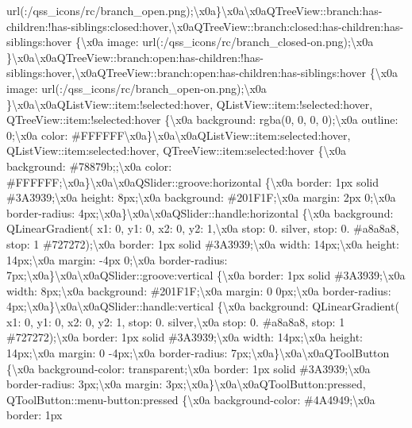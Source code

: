 url(\+:/qss\+\_\+icons/rc/branch\+\_\+open.\+png);\textbackslash{}x0a\}\textbackslash{}x0a\textbackslash{}x0a\+Q\+Tree\+View\+::branch\+:has-\/children\+:!has-\/siblings\+:closed\+:hover,\textbackslash{}x0a\+Q\+Tree\+View\+::branch\+:closed\+:has-\/children\+:has-\/siblings\+:hover \{\textbackslash{}x0a image\+: url(\+:/qss\+\_\+icons/rc/branch\+\_\+closed-\/on.\+png);\textbackslash{}x0a \}\textbackslash{}x0a\textbackslash{}x0a\+Q\+Tree\+View\+::branch\+:open\+:has-\/children\+:!has-\/siblings\+:hover,\textbackslash{}x0a\+Q\+Tree\+View\+::branch\+:open\+:has-\/children\+:has-\/siblings\+:hover \{\textbackslash{}x0a image\+: url(\+:/qss\+\_\+icons/rc/branch\+\_\+open-\/on.\+png);\textbackslash{}x0a \}\textbackslash{}x0a\textbackslash{}x0a\+Q\+List\+View\+::item\+:!selected\+:hover, Q\+List\+View\+::item\+:!selected\+:hover, Q\+Tree\+View\+::item\+:!selected\+:hover \{\textbackslash{}x0a background\+: rgba(0, 0, 0, 0);\textbackslash{}x0a outline\+: 0;\textbackslash{}x0a color\+: \#\+F\+F\+F\+F\+F\+F\textbackslash{}x0a\}\textbackslash{}x0a\textbackslash{}x0a\+Q\+List\+View\+::item\+:selected\+:hover, Q\+List\+View\+::item\+:selected\+:hover, Q\+Tree\+View\+::item\+:selected\+:hover \{\textbackslash{}x0a background\+: \#78879b;;\textbackslash{}x0a color\+: \#\+F\+F\+F\+F\+F\+F;\textbackslash{}x0a\}\textbackslash{}x0a\textbackslash{}x0a\+Q\+Slider\+::groove\+:horizontal \{\textbackslash{}x0a border\+: 1px solid \#3\+A3939;\textbackslash{}x0a height\+: 8px;\textbackslash{}x0a background\+: \#201\+F1\+F;\textbackslash{}x0a margin\+: 2px 0;\textbackslash{}x0a border-\/radius\+: 4px;\textbackslash{}x0a\}\textbackslash{}x0a\textbackslash{}x0a\+Q\+Slider\+::handle\+:horizontal \{\textbackslash{}x0a background\+: Q\+Linear\+Gradient( x1\+: 0, y1\+: 0, x2\+: 0, y2\+: 1,\textbackslash{}x0a stop\+: 0. silver, stop\+: 0. \#a8a8a8, stop\+: 1 \#727272);\textbackslash{}x0a border\+: 1px solid \#3\+A3939;\textbackslash{}x0a width\+: 14px;\textbackslash{}x0a height\+: 14px;\textbackslash{}x0a margin\+: -\/4px 0;\textbackslash{}x0a border-\/radius\+: 7px;\textbackslash{}x0a\}\textbackslash{}x0a\textbackslash{}x0a\+Q\+Slider\+::groove\+:vertical \{\textbackslash{}x0a border\+: 1px solid \#3\+A3939;\textbackslash{}x0a width\+: 8px;\textbackslash{}x0a background\+: \#201\+F1\+F;\textbackslash{}x0a margin\+: 0 0px;\textbackslash{}x0a border-\/radius\+: 4px;\textbackslash{}x0a\}\textbackslash{}x0a\textbackslash{}x0a\+Q\+Slider\+::handle\+:vertical \{\textbackslash{}x0a background\+: Q\+Linear\+Gradient( x1\+: 0, y1\+: 0, x2\+: 0, y2\+: 1, stop\+: 0. silver,\textbackslash{}x0a stop\+: 0. \#a8a8a8, stop\+: 1 \#727272);\textbackslash{}x0a border\+: 1px solid \#3\+A3939;\textbackslash{}x0a width\+: 14px;\textbackslash{}x0a height\+: 14px;\textbackslash{}x0a margin\+: 0 -\/4px;\textbackslash{}x0a border-\/radius\+: 7px;\textbackslash{}x0a\}\textbackslash{}x0a\textbackslash{}x0a\+Q\+Tool\+Button \{\textbackslash{}x0a background-\/color\+: transparent;\textbackslash{}x0a border\+: 1px solid \#3\+A3939;\textbackslash{}x0a border-\/radius\+: 3px;\textbackslash{}x0a margin\+: 3px;\textbackslash{}x0a\}\textbackslash{}x0a\textbackslash{}x0a\+Q\+Tool\+Button\+:pressed, Q\+Tool\+Button\+::menu-\/button\+:pressed \{\textbackslash{}x0a background-\/color\+: \#4\+A4949;\textbackslash{}x0a border\+: 1px 